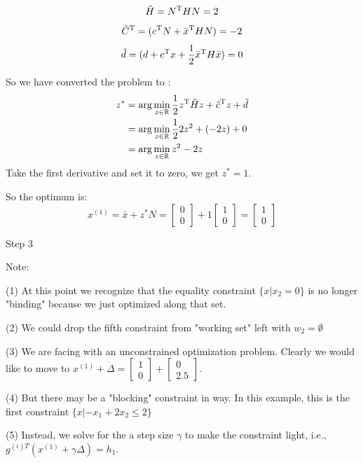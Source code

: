 $$\tilde{H} = N^{{\rm T}}HN = 2$$
$$\tilde{C}^{{\rm T}} = (c^{{\rm T}}N + \bar{x}^{{\rm T}} HN)= -2$$
$$\tilde{d}= (d+c^{{\rm T}}x + \frac{1}{2}\bar{x}^{{\rm T}}H\bar{x})=0$$


So we have converted the problem to :
\begin{align*}
z^* 
&= \arg\min_{z\in\mathbb{R}} \frac{1}{2} z^{{\rm T}}\tilde{H}z + \tilde{c}^{{\rm T}}z + \tilde{d}\\
&= \arg\min_{z\in\mathbb{R}} \frac{1}{2}2z^2 + (-2z)+ 0\\
&= \arg\min_{z\in\mathbb{R}} z^2 - 2z
\end{align*}
Take the first derivative and set it to zero, we get $z^* = 1$.

So the optimum is:
\begin{equation*}
x^{(1)}= \bar{x}+ z^*N = 
\begin{bmatrix}
0\\
0
\end{bmatrix}
 + 1
\begin{bmatrix}
1\\
0
\end{bmatrix} = 
\begin{bmatrix}
1\\
0
\end{bmatrix}
\end{equation*}


Step 3

Note:

(1) At this point we recognize that the equality constraint $\{x|x_2=0\}$ is no longer "binding" because we just optimized along that set.

(2) We could drop the fifth constraint from "working set" left with $w_2 =\emptyset$

(3) We are facing with an unconstrained optimization problem. Clearly we would like to move to $x^{(1)} +\Delta = 
\begin{bmatrix}
1\\
0
\end{bmatrix}
+
\begin{bmatrix}
0\\
2.5
\end{bmatrix}
$.

(4) But there may be a "blocking" constraint in way. In this example, this is the first constraint $\{x|-x_1 +2x_2\leq 2 \}$

(5) Instead, we solve for the a step size $\gamma$ to make the constraint light, i.e., $g^{(i)T}(x^{(1)}+\gamma \Delta) = h_1$. 


